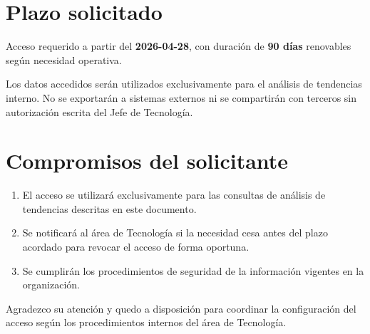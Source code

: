 \documentclass{../base/canon}
\begin{document}
\section{Plazo solicitado}

Acceso requerido a partir del \textbf{2026-04-28}, con duración de \textbf{90 días}
renovables según necesidad operativa.

\begin{ObservationBox}
  Los datos accedidos serán utilizados exclusivamente para el análisis de tendencias
  interno.  No se exportarán a sistemas externos ni se compartirán con terceros
  sin autorización escrita del Jefe de Tecnología.
\end{ObservationBox}

\section{Compromisos del solicitante}

\begin{enumerate}
  \item El acceso se utilizará exclusivamente para las consultas de análisis
        de tendencias descritas en este documento.
  \item Se notificará al área de Tecnología si la necesidad cesa antes del plazo
        acordado para revocar el acceso de forma oportuna.
  \item Se cumplirán los procedimientos de seguridad de la información vigentes
        en la organización.
\end{enumerate}

Agradezco su atención y quedo a disposición para coordinar la configuración del
acceso según los procedimientos internos del área de Tecnología.


\ContactSignature
\end{document}
